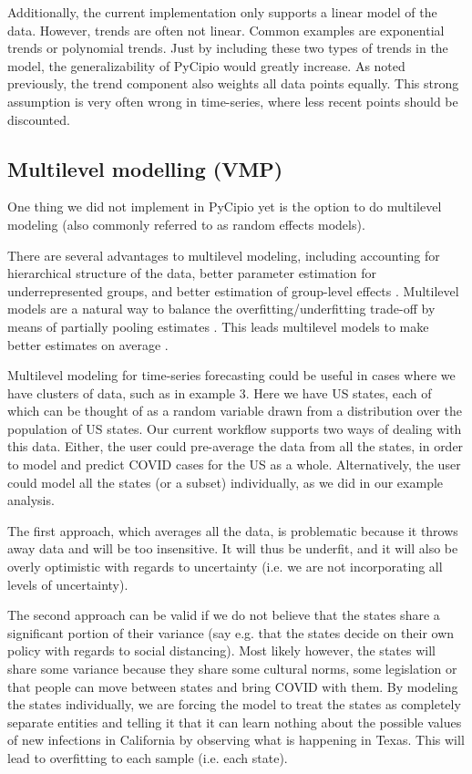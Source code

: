 \documentclass{article}
\begin{document}
\noindent Additionally, the current implementation only supports a linear model of the data. However, trends are often not linear. Common examples are exponential trends or polynomial trends. Just by including these two types of trends in the model, the generalizability of PyCipio would greatly increase. As noted previously, the trend component also weights all data points equally. This strong assumption is very often wrong in time-series, where less recent points should be discounted. 

\subsection{Multilevel modelling (VMP)}

\noindent One thing we did not implement in PyCipio yet is the option to do multilevel modeling (also commonly referred to as random effects models).

\noindent There are several advantages to multilevel modeling, including accounting for hierarchical structure of the data, better parameter estimation for underrepresented groups, and better estimation of group-level effects \cite{pymc3}. Multilevel models are a natural way to balance the overfitting/underfitting trade-off by means of partially pooling estimates \cite[p.~14]{McElreath}. This leads multilevel models to make better estimates on average \cite[p.~414]{McElreath}.

\noindent Multilevel modeling for time-series forecasting could be useful in cases where we have clusters of data, such as in example 3. Here we have US states, each of which can be thought of as a random variable drawn from a distribution over the population of US states. Our current workflow supports two ways of dealing with this data. Either, the user could pre-average the data from all the states, in order to model and predict COVID cases for the US as a whole. Alternatively, the user could model all the states (or a subset) individually, as we did in our example analysis.

\noindent The first approach, which averages all the data, is problematic because it throws away data and will be too insensitive. It will thus be underfit, and it will also be overly optimistic with regards to uncertainty (i.e. we are not incorporating all levels of uncertainty).

\noindent The second approach can be valid if we do not believe that the states share a significant portion of their variance (say e.g. that the states decide on their own policy with regards to social distancing). Most likely however, the states will share some variance because they share some cultural norms, some legislation or that people can move between states and bring COVID with them. By modeling the states individually, we are forcing the model to treat the states as completely separate entities and telling it that it can learn nothing about the possible values of new infections in California by observing what is happening in Texas. This will lead to overfitting to each sample (i.e. each state).
\end{document}
